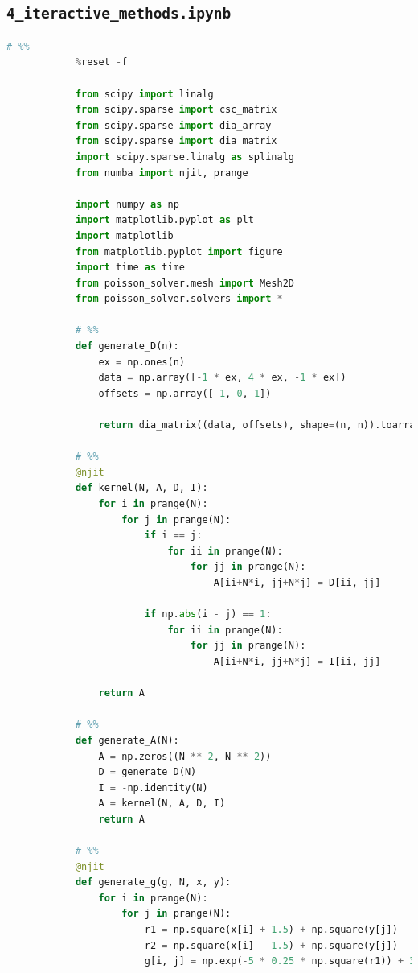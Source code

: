 \documentclass[12pt]{article}
\begin{document}
    \subsection{\texttt{4\_iteractive\_methods.ipynb}}
        \begin{lstlisting}[language={Python}]
            # %%
            %reset -f
            
            from scipy import linalg
            from scipy.sparse import csc_matrix
            from scipy.sparse import dia_array
            from scipy.sparse import dia_matrix
            import scipy.sparse.linalg as splinalg
            from numba import njit, prange
            
            import numpy as np
            import matplotlib.pyplot as plt
            import matplotlib
            from matplotlib.pyplot import figure
            import time as time
            from poisson_solver.mesh import Mesh2D
            from poisson_solver.solvers import *
            
            # %%
            def generate_D(n):
                ex = np.ones(n)
                data = np.array([-1 * ex, 4 * ex, -1 * ex])
                offsets = np.array([-1, 0, 1])
                
                return dia_matrix((data, offsets), shape=(n, n)).toarray()
            
            # %%
            @njit
            def kernel(N, A, D, I):
                for i in prange(N):
                    for j in prange(N):
                        if i == j:
                            for ii in prange(N):
                                for jj in prange(N):
                                    A[ii+N*i, jj+N*j] = D[ii, jj]
                                    
                        if np.abs(i - j) == 1:
                            for ii in prange(N):
                                for jj in prange(N):
                                    A[ii+N*i, jj+N*j] = I[ii, jj]
                                    
                return A
            
            # %%
            def generate_A(N):
                A = np.zeros((N ** 2, N ** 2))
                D = generate_D(N)
                I = -np.identity(N)
                A = kernel(N, A, D, I)
                return A
            
            # %%
            @njit
            def generate_g(g, N, x, y):
                for i in prange(N):
                    for j in prange(N):
                        r1 = np.square(x[i] + 1.5) + np.square(y[j])
                        r2 = np.square(x[i] - 1.5) + np.square(y[j])
                        g[i, j] = np.exp(-5 * 0.25 * np.square(r1)) + 3 * 0.5 * np.exp(-np.square(r2))
            

\end{lstlisting}
\end{document}
